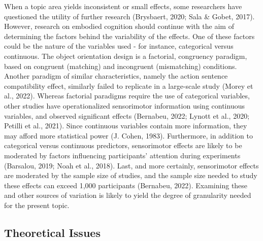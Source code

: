 \documentclass[
  man,floatsintext]{apa7}
\begin{document}
When a topic area yields inconsistent or small effects, some researchers
have questioned the utility of further research (Brysbaert, 2020; Sala \& Gobet, 2017). However, research on embodied cognition should continue with
the aim of determining the factors behind the variability of the
effects. One of these factors could be the nature of the variables
used - for instance, categorical versus continuous. The object
orientation design is a factorial, congruency paradigm, based on
congruent (matching) and incongruent (mismatching) conditions. Another
paradigm of similar characteristics, namely the action sentence
compatibility effect, similarly failed to replicate in a large-scale
study (Morey et al., 2022). Whereas factorial paradigms require the use of
categorical variables, other studies have operationalized sensorimotor
information using continuous variables, and observed significant effects
(Bernabeu, 2022; Lynott et al., 2020; Petilli et al., 2021). Since continuous variables
contain more information, they may afford more statistical power
(J. Cohen, 1983). Furthermore, in addition to categorical versus continuous
predictors, sensorimotor effects are likely to be moderated by factors
influencing participants' attention during experiments
(Barsalou, 2019; Noah et al., 2018). Last, and
more certainly, sensorimotor effects are moderated by the sample size of
studies, and the sample size needed to study these effects can exceed
1,000 participants (Bernabeu, 2022). Examining these and other sources of
variation is likely to yield the degree of granularity needed for the
present topic.

\hypertarget{theoretical-issues}{%
\subsection{Theoretical Issues}\label{theoretical-issues}}
\end{document}
